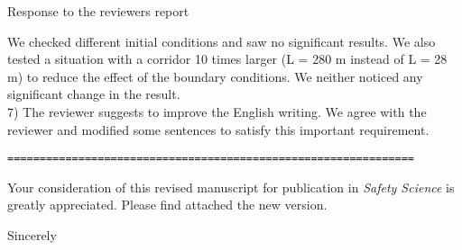 \documentclass[a4paper,12pt]{letter}
\begin{document}
\begin{letter}{Response to the reviewers report}
{We checked different initial conditions and saw no significant results. We also tested a situation with a corridor 10 times larger (L = 280 m instead of L = 28 m) to reduce the effect of the boundary conditions. We neither noticed any significant change in the result. \\

7) The reviewer suggests to improve the English writing. We agree with the reviewer and modified some sentences to satisfy this important requirement.  \\

\begin{verbatim}
===============================================================
\end{verbatim}

}

Your consideration of this revised manuscript for publication in 
\textit{Safety Science} is greatly appreciated. 
Please find attached the new version. \\


\closing{Sincerely}


\end{letter}
\end{document}
